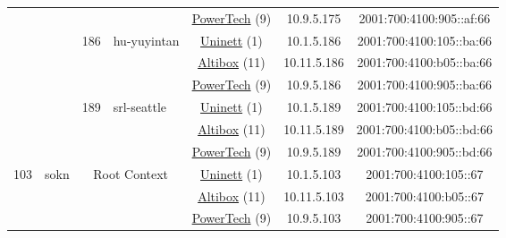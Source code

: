 \begin{small}
\begin{center}
\begin{longtable}{|c|c|c|c|c|c|c|c|}
  &  &  &  & \multicolumn{2}{|c|}{\tiny{\href{http://www.powertech.no}{PowerTech} (9)}} & \tiny{10.9.5.175} & \tiny{2001:700:4100:905::af:66} \\* \cline{3-3}\cline{4-4}\cline{5-5}\cline{6-6}\cline{7-7}\cline{8-8}
  &  & \multirow{3}{*}{\tiny{186}} & \multicolumn{1}{|l|}{\multirow{3}{*}{\tiny{hu-yuyintan}}} & \multicolumn{2}{|c|}{\tiny{\href{https://www.uninett.no}{Uninett} (1)}} & \tiny{10.1.5.186} & \tiny{2001:700:4100:105::ba:66} \\* \cline{5-5}\cline{6-6}\cline{7-7}\cline{8-8}
  &  &  &  & \multicolumn{2}{|c|}{\tiny{\href{https://www.altibox.no}{Altibox} (11)}} & \tiny{10.11.5.186} & \tiny{2001:700:4100:b05::ba:66} \\* \cline{5-5}\cline{6-6}\cline{7-7}\cline{8-8}
  &  &  &  & \multicolumn{2}{|c|}{\tiny{\href{http://www.powertech.no}{PowerTech} (9)}} & \tiny{10.9.5.186} & \tiny{2001:700:4100:905::ba:66} \\* \cline{3-3}\cline{4-4}\cline{5-5}\cline{6-6}\cline{7-7}\cline{8-8}
  &  & \multirow{3}{*}{\tiny{189}} & \multicolumn{1}{|l|}{\multirow{3}{*}{\tiny{srl-seattle}}} & \multicolumn{2}{|c|}{\tiny{\href{https://www.uninett.no}{Uninett} (1)}} & \tiny{10.1.5.189} & \tiny{2001:700:4100:105::bd:66} \\* \cline{5-5}\cline{6-6}\cline{7-7}\cline{8-8}
  &  &  &  & \multicolumn{2}{|c|}{\tiny{\href{https://www.altibox.no}{Altibox} (11)}} & \tiny{10.11.5.189} & \tiny{2001:700:4100:b05::bd:66} \\* \cline{5-5}\cline{6-6}\cline{7-7}\cline{8-8}
  &  &  &  & \multicolumn{2}{|c|}{\tiny{\href{http://www.powertech.no}{PowerTech} (9)}} & \tiny{10.9.5.189} & \tiny{2001:700:4100:905::bd:66} \\ \hline
 \multirow{48}{*}{\tiny{103}} & \multicolumn{1}{|l|}{\multirow{48}{*}{\tiny{sokn}}} & \multicolumn{2}{|c|}{\multirow{3}{*}{\tiny{Root Context}}} & \multicolumn{2}{|c|}{\tiny{\href{https://www.uninett.no}{Uninett} (1)}} & \tiny{10.1.5.103} & \tiny{2001:700:4100:105::67} \\* \cline{5-5}\cline{6-6}\cline{7-7}\cline{8-8}
  &  & \multicolumn{2}{|c|}{} & \multicolumn{2}{|c|}{\tiny{\href{https://www.altibox.no}{Altibox} (11)}} & \tiny{10.11.5.103} & \tiny{2001:700:4100:b05::67} \\* \cline{5-5}\cline{6-6}\cline{7-7}\cline{8-8}
  &  & \multicolumn{2}{|c|}{} & \multicolumn{2}{|c|}{\tiny{\href{http://www.powertech.no}{PowerTech} (9)}} & \tiny{10.9.5.103} & \tiny{2001:700:4100:905::67} \\* \cline{3-3}\cline{4-4}\cline{5-5}\cline{6-6}\cline{7-7}\cline{8-8}

\end{longtable}
\end{center}
\end{small}
